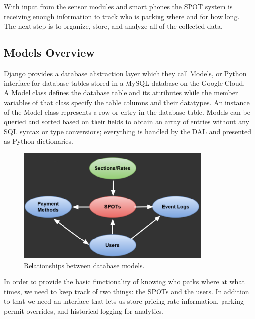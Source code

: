 With input from the sensor modules and smart phones the SPOT system is receiving enough information to track who is parking where and for how long.
The next step is to organize, store, and analyze all of the collected data.

\subsection{Models Overview}
Django provides a database abstraction layer which they call Models, or Python interface for database tables stored in a MySQL database on the Google Cloud.
A Model class defines the database table and its attributes while the member variables of that class specify the table columns and their datatypes.
An instance of the Model class represents a row or entry in the database table.
Models can be queried and sorted based on their fields to obtain an array of entries without any SQL syntax or type conversions; everything is handled by the DAL and presented as Python dictionaries.

\begin{figure}[ht!]
\centering
\includegraphics[width=0.85\textwidth]{pictures/models.png}
\caption{Relationships between database models.}
\end{figure}

In order to provide the basic functionality of knowing who parks where at what times, we need to keep track of two things: the SPOTs and the users.  
In addition to that we need an interface that lets us store pricing rate information, parking permit overrides, and historical logging for analytics.


